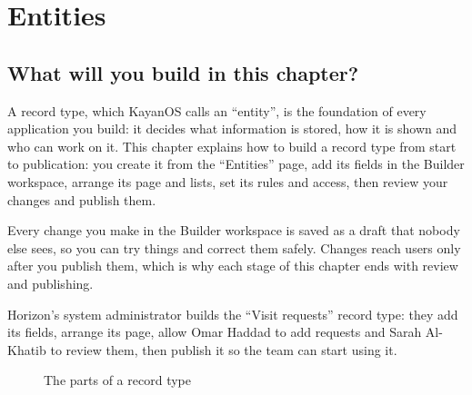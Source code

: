 \chapter{Entities}
\label{ch:builder-entities}

\section{What will you build in this chapter?}
\label{sec:builder-entities-intro}

A record type, which KayanOS calls an “entity”, is the foundation of every application you build: it decides what information is stored, how it is shown and who can work on it. This chapter explains how to build a record type from start to publication: you create it from the “Entities” page, add its fields in the Builder workspace, arrange its page and lists, set its rules and access, then review your changes and publish them.

Every change you make in the Builder workspace is saved as a draft that nobody else sees, so you can try things and correct them safely. Changes reach users only after you publish them, which is why each stage of this chapter ends with review and publishing.

\begin{rcnote}
Horizon's system administrator builds the “Visit requests” record type: they add its fields, arrange its page, allow Omar Haddad to add requests and Sarah Al-Khatib to review them, then publish it so the team can start using it.
\end{rcnote}

\begin{figure}[H]
\centering
{}
\rclegend
\caption{The parts of a record type}
\label{fig:builder-models}
\end{figure}

